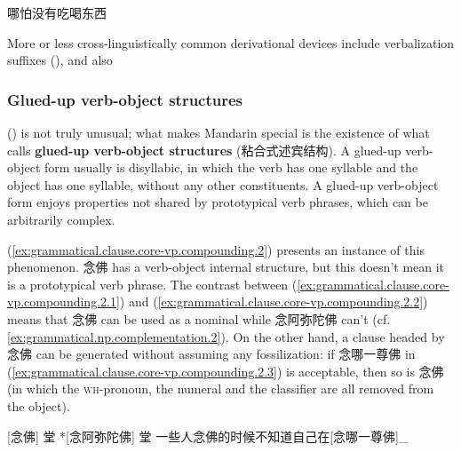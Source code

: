 \documentclass[UTF8, a4paper, oneside, scheme=plain, 12pt]{ctexrep}
\newcommand*{\citepages}[1]{pp.~{#1}}
\newcommand*{\concept}[1]{\textbf{#1}}
\newcommand*{\category}[1]{\textsc{#1}}
\begin{document}
\begin{exe}
    \ex\label{ex:grammatical.clause.core-vp.compounding.coordination.1} 哪怕没有吃喝东西
\end{exe}

More or less cross-linguistically common derivational devices include verbalization suffixes 
(),
and also


\subsubsection{Glued-up verb-object structures}\label{sec:grammatical.clause.core-vp.derivation.glue}

() is not truly unusual;
what makes Mandarin special is the existence of what \citet[\citepages{128-9}]{zhudexigrammar}
calls \concept{glued-up verb-object structures} (粘合式述宾结构).
A glued-up verb-object form usually is disyllabic,
in which the verb has one syllable and the object has one syllable,
without any other constituents.
A glued-up verb-object form enjoys properties not shared by prototypical verb phrases,
which can be arbitrarily complex.

(\ref{ex:grammatical.clause.core-vp.compounding.2}) presents an instance of this phenomenon.
念佛 has a verb-object internal structure,
but this doesn't mean it is a prototypical verb phrase.
The contrast between (\ref{ex:grammatical.clause.core-vp.compounding.2.1})
and (\ref{ex:grammatical.clause.core-vp.compounding.2.2}) means that 
念佛 can be used as a nominal while 念阿弥陀佛 can't (cf. \ref{ex:grammatical.np.complementation.2}).
On the other hand, a clause headed by 念佛 can be generated without assuming any fossilization:
if 念哪一尊佛 in (\ref{ex:grammatical.clause.core-vp.compounding.2.3}) is acceptable,
then so is 念佛 (in which the \category{wh}-pronoun, the numeral and the classifier
are all removed from the object).

\begin{exe}
    \ex\label{ex:grammatical.clause.core-vp.compounding.2}
    \begin{xlist}
        \ex\label{ex:grammatical.clause.core-vp.compounding.2.1} {} [念佛] 堂 
        \ex\label{ex:grammatical.clause.core-vp.compounding.2.2} {} *[念阿弥陀佛] 堂 
        \ex\label{ex:grammatical.clause.core-vp.compounding.2.3} 一些人念佛的时候不知道自己在[念哪一尊佛]_{}
    \end{xlist}
\end{exe}
\end{document}
